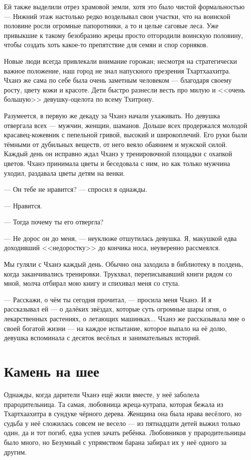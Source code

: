 Ей также выделили отрез храмовой земли, хотя это было чистой формальностью --- Нижний этаж настолько редко возделывал свои участки, что на воинской половине росли огромные папоротники, а то и целые саговые леса.
Уже привыкшие к такому безобразию жрецы просто отгородили воинскую половину, чтобы создать хоть какое-то препятствие для семян и спор сорняков.

Новые люди всегда привлекали внимание горожан;
несмотря на стратегически важное положение, наш город не знал напускного презрения Тхартхаахитра.
Чханэ же сама по себе была очень заметным человеком --- благодаря своему росту, цвету кожи и красоте.
Дети быстро разнесли весть про милую и <<очень большую>> девушку-оцелота по всему Тхитрону.

Разумеется, в первую же декаду за Чханэ начали ухаживать.
Но девушка отвергала всех --- мужчин, женщин, шаманов.
Дольше всех продержался молодой красавец-кожевник с пепельной гривой, высокий и широкоплечий.
Его руки были тёмными от дубильных веществ, от него веяло обаянием и мужской силой.
Каждый день он исправно ждал Чханэ у тренировочной площадки с охапкой цветов.
Чханэ принимала цветы и беседовала с ним, но как только мужчина уходил, раздавала цветы детям на венки.

--- Он тебе не нравится? --- спросил я однажды.

--- Нравится.

--- Тогда почему ты его отвергла?

--- Не дорос он до меня, --- неуклюже отшутилась девушка.
Я, макушкой едва доходивший <<недоростку>> до кончика носа, неуверенно рассмеялся.

Мы гуляли с Чханэ каждый день.
Обычно она заходила в библиотеку в полдень, когда заканчивались тренировки.
Трукхвал, переписывавший книги рядом со мной, молча отбирал мою книгу и спихивал меня со стула.

--- Расскажи, о чём ты сегодня прочитал, --- просила меня Чханэ.
И я рассказывал ей --- о далёких звёздах, которые суть огромные шары огня, о лекарственных растениях, о летающих машинках...
Чханэ же рассказывала мне о своей богатой жизни --- на каждое испытание, которое выпало на её долю, девушка вспоминала с десяток весёлых и занимательных историй.

\section{Камень на шее}

Однажды, когда дарители Чханэ ещё жили вместе, у неё заболела прародительница.
Та самая, любовница жреца-кутрапа, которая бежала из Тхартхаахитра в сундуке чёрного дерева.
Женщина она была нрава весёлого, но судьба у неё сложилась совсем не весело --- из пятнадцати детей выжил только один, да и тот погиб, едва успев зачать ребёнка.
Любовников у прародительницы было много, но Безумный с упрямством барана забирал их у неё одного за другим.

